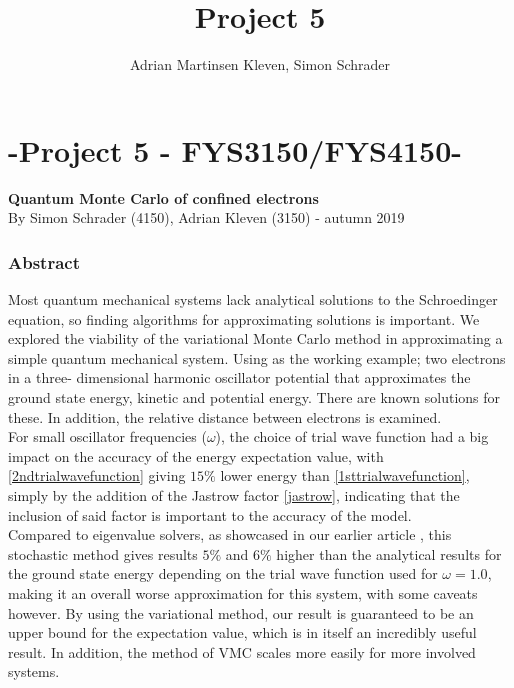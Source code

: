 \documentclass[10pt,a4paper]{article}
\author{Adrian Martinsen Kleven, Simon Schrader}
\title{Project 5}
\begin{document}
\part*{-Project 5 - FYS3150/FYS4150-
}
{\large \textbf{Quantum Monte Carlo of confined electrons}}\\
{\large By Simon Schrader (4150), Adrian Kleven (3150) - autumn 2019
}
\tableofcontents

\listoffigures
\listoftables


\clearpage

\section{Abstract}
Most quantum mechanical systems lack analytical solutions to the Schroedinger equation, so finding algorithms for approximating solutions is important. We explored the viability of the variational Monte Carlo method in approximating a simple quantum mechanical system. Using as the working example; two electrons in a three- dimensional harmonic oscillator potential that approximates the ground state energy, kinetic and potential energy. There are known solutions for these\cite{Project2}. In addition, the relative distance between electrons is examined.\\
For small oscillator frequencies ($\omega$), the choice of trial wave function had a big impact on the accuracy of the energy expectation value, with \eqref{2ndtrialwavefunction} giving $15\%$ lower energy than \eqref{1sttrialwavefunction}, simply by the addition of the Jastrow factor \eqref{jastrow}, indicating that the inclusion of said factor is important to the accuracy of the model.\\Compared to eigenvalue solvers, as showcased in our earlier article \cite{Project2}, this stochastic method gives results $5\%$ and $6\%$ higher than the analytical results for the ground state energy depending on the trial wave function used for $\omega=1.0$,  making it an overall worse approximation for this system, with some caveats however. By using the variational method, our result is guaranteed to be an upper bound for the expectation value, which is in itself an incredibly useful result. In addition, the method of VMC scales more easily for more involved systems.
\end{document}
